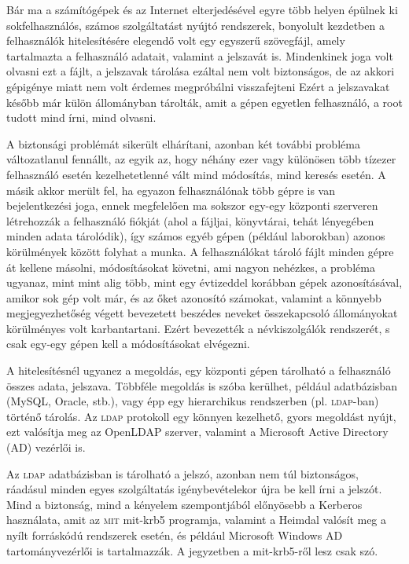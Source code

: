 
Bár ma a számítógépek és az Internet elterjedésével egyre több helyen épülnek ki sokfelhasználós, számos szolgáltatást
nyújtó rendszerek, bonyolult kezdetben a felhasználók hitelesítésére elegendő volt egy egyszerű szövegfájl, amely
tartalmazta a felhasználó adatait, valamint a jelszavát is. Mindenkinek joga volt olvasni ezt a fájlt, a jelszavak
tárolása ezáltal nem volt biztonságos, de az akkori gépigénye miatt nem volt érdemes megpróbálni visszafejteni Ezért a
jelszavakat később már külön állományban tárolták, amit a gépen egyetlen felhasználó, a root tudott mind írni, mind
olvasni.

A biztonsági problémát sikerült elhárítani, azonban két további probléma változatlanul fennállt, az egyik az, hogy
néhány ezer vagy különösen több tízezer felhasználó esetén kezelhetetlenné vált mind módosítás, mind keresés esetén. A
másik akkor merült fel, ha egyazon felhasználónak több gépre is van bejelentkezési joga, ennek megfelelően ma sokszor
egy-egy központi szerveren létrehozzák a felhasználó fiókját (ahol a fájljai, könyvtárai, tehát lényegében minden adata
tárolódik), így számos egyéb gépen (például laborokban) azonos körülmények között folyhat a munka. A felhasználókat
tároló fájlt minden gépre át kellene másolni, módosításokat követni, ami nagyon nehézkes, a probléma ugyanaz, mint  mint
alig több, mint egy évtizeddel korábban gépek azonosításával, amikor sok gép volt már, és az őket azonosító számokat,
valamint a könnyebb megjegyezhetőség végett bevezetett beszédes neveket összekapcsoló állományokat körülményes volt
karbantartani. Ezért bevezették a névkiszolgálók rendszerét, s csak egy-egy gépen kell a módosításokat elvégezni.

A hitelesítésnél ugyanez a megoldás, egy központi gépen tárolható a felhasználó összes adata, jelszava. Többféle
megoldás is szóba kerülhet, például adatbázisban (MySQL, Oracle, stb.), vagy épp egy hierarchikus rendszerben
(pl. \textsc{ldap}-ban) történő tárolás. Az \textsc{ldap} protokoll egy könnyen kezelhető, gyors megoldást nyújt, ezt
valósítja meg az OpenLDAP szerver, valamint a Microsoft Active Directory (\textsc{AD}) vezérlői is. 

Az \textsc{ldap} adatbázisban is tárolható a jelszó, azonban nem túl biztonságos, ráadásul minden egyes szolgáltatás
igénybevételekor újra be kell írni a jelszót. Mind a biztonság, mind a kényelem szempontjából előnyösebb a Kerberos
használata, amit az \textsc{mit} mit-krb5 programja, valamint a Heimdal valósít meg a nyílt forráskódú rendszerek
esetén, és például Microsoft Windows AD tartományvezérlői is tartalmazzák. A jegyzetben a mit-krb5-ről lesz csak szó.

